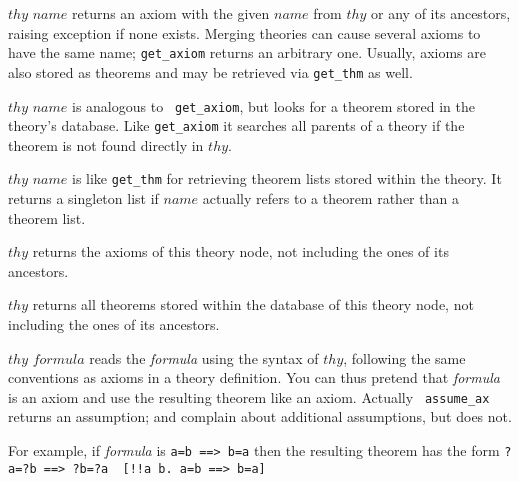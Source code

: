 \begin{ttdescription}
\item[\ttindexbold{get_axiom} $thy$ $name$] returns an axiom with the
  given $name$ from $thy$ or any of its ancestors, raising exception
   if none exists.  Merging theories can cause several
  axioms to have the same name; {\tt get_axiom} returns an arbitrary
  one.  Usually, axioms are also stored as theorems and may be
  retrieved via \texttt{get_thm} as well.
  
\item[\ttindexbold{get_thm} $thy$ $name$] is analogous to {\tt
    get_axiom}, but looks for a theorem stored in the theory's
  database.  Like {\tt get_axiom} it searches all parents of a theory
  if the theorem is not found directly in $thy$.
  
\item[\ttindexbold{get_thms} $thy$ $name$] is like \texttt{get_thm}
  for retrieving theorem lists stored within the theory.  It returns a
  singleton list if $name$ actually refers to a theorem rather than a
  theorem list.
  
\item[\ttindexbold{axioms_of} $thy$] returns the axioms of this theory
  node, not including the ones of its ancestors.
  
\item[\ttindexbold{thms_of} $thy$] returns all theorems stored within
  the database of this theory node, not including the ones of its
  ancestors.
  
\item[\ttindexbold{assume_ax} $thy$ $formula$] reads the {\it formula}
  using the syntax of $thy$, following the same conventions as axioms
  in a theory definition.  You can thus pretend that {\it formula} is
  an axiom and use the resulting theorem like an axiom.  Actually {\tt
    assume_ax} returns an assumption;  and
   complain about additional assumptions, but
   does not.

For example, if {\it formula} is
\hbox{\tt a=b ==> b=a} then the resulting theorem has the form
\hbox{\verb'?a=?b ==> ?b=?a  [!!a b. a=b ==> b=a]'}
\end{ttdescription}


